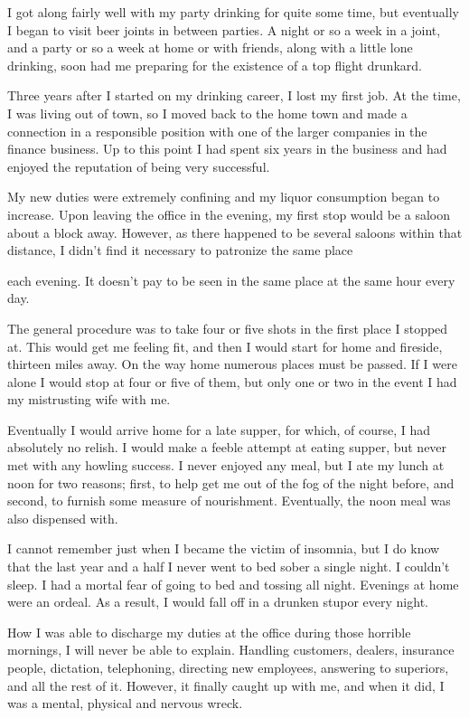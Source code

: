 \begin{biblechapter}
I got along fairly well with my party drinking for quite some time, but eventually I began to visit beer joints in between parties. A night or so a week in a joint, and a party or so a week at home or with friends, along with a little lone drinking, soon had me preparing for the existence of a top flight drunkard.

Three years after I started on my drinking career, I lost my first job. At the time, I was living out of town, so I moved back to the home town and made a connection in a responsible position with one of the larger companies in the finance business. Up to this point I had spent six years in the business and had enjoyed the reputation of being very successful.

My new duties were extremely confining and my liquor consumption began to increase. Upon leaving the office in the evening, my first stop would be a saloon about a block away. However, as there happened to be several saloons within that distance, I didn’t find it necessary to patronize the same place

each evening. It doesn’t pay to be seen in the same place at the same hour every day.

The general procedure was to take four or five shots in the first place I stopped at. This would get me feeling fit, and then I would start for home and fireside, thirteen miles away. On the way home numerous places must be passed. If I were alone I would stop at four or five of them, but only one or two in the event I had my mistrusting wife with me.

Eventually I would arrive home for a late supper, for which, of course, I had absolutely no relish. I would make a feeble attempt at eating supper, but never met with any howling success. I never enjoyed any meal, but I ate my lunch at noon for two reasons; first, to help get me out of the fog of the night before, and second, to furnish some measure of nourishment. Eventually, the noon meal was also dispensed with.

I cannot remember just when I became the victim of insomnia, but I do know that the last year and a half I never went to bed sober a single night. I couldn’t sleep. I had a mortal fear of going to bed and tossing all night. Evenings at home were an ordeal. As a result, I would fall off in a drunken stupor every night.

How I was able to discharge my duties at the office during those horrible mornings, I will never be able to explain. Handling customers, dealers, insurance people, dictation, telephoning, directing new employees, answering to superiors, and all the rest of it. However, it finally caught up with me, and when it did, I was a mental, physical and nervous wreck.


\end{biblechapter}
